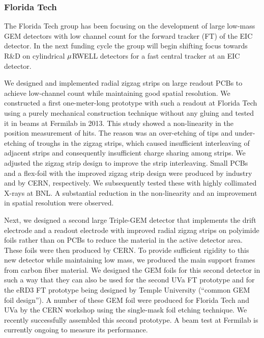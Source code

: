 \subsubsection{Florida Tech} 
The Florida Tech group has been focusing on the development of large low-mass GEM detectors with low channel count for the forward tracker (FT) of the EIC detector. In the next funding cycle the group will begin shifting focus towards R\&D on cylindrical $\boldmath{\mu}$RWELL detectors for a fast central tracker at an EIC detector.

We designed and implemented radial zigzag strips on large readout PCBs to achieve low-channel count while maintaining good spatial resolution. We constructed a first one-meter-long prototype with such a readout at Florida Tech using a purely mechanical construction technique without any gluing and tested it in beams at Fermilab in 2013. This study showed a non-linearity in the position measurement of hits\cite{Zhang:2015pqa}. The reason was an over-etching of tips and under-etching of troughs in the zigzag strips, which caused insufficient interleaving of adjacent strips and consequently insufficient charge sharing among strips. We adjusted the zigzag strip design to improve the strip interleaving. Small PCBs and a flex-foil with the improved zigzag strip design were produced by industry and by CERN, respectively. We subsequently tested these with highly collimated X-rays at BNL. A substantial reduction in the non-linearity and an improvement in spatial resolution were observed\cite{Zhang:2017dqw}.

Next, we designed a second large Triple-GEM detector that implements the drift electrode and a readout electrode with improved radial zigzag strips on polyimide foils rather than on PCBs to reduce the material in the active detector area\cite{Hohlmann:2017sqj}. These foils were then produced by CERN. To provide sufficient rigidity to this new detector while maintaining low mass, we produced the main support frames from carbon fiber material. We designed the GEM foils for this second detector in such a way that they can also be used for the second UVa FT prototype and for the eRD3 FT prototype being designed by Temple University (``common GEM foil design''). A number of these GEM foil were produced for Florida Tech and UVa by the CERN workshop using the single-mask foil etching technique. We recently successfully assembled this second prototype. A beam test at Fermilab is currently ongoing to measure its performance.